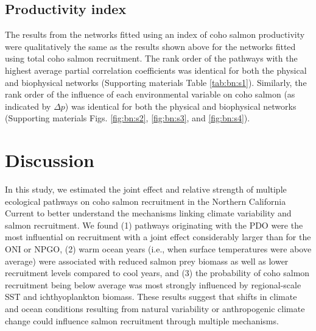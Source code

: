 \subsection{Productivity index}

The results from the networks fitted using an index of coho salmon productivity
were qualitatively the same as the results shown above for the networks fitted
using total coho salmon recruitment. The rank order of the pathways with the
highest average partial correlation coefficients was identical for both the
physical and biophysical networks (Supporting materials Table \ref{tab:bn:s1}). Similarly, the
rank order of the influence of each environmental variable on coho salmon (as
indicated by \(\Delta p\)) was identical for both the physical and biophysical
networks (Supporting materials Figs. \ref{fig:bn:s2}, \ref{fig:bn:s3}, and
\ref{fig:bn:s4}).



\section{Discussion}

In this study, we estimated the joint effect and relative strength of multiple
ecological pathways on coho salmon recruitment in the Northern California
Current to better understand the mechanisms linking climate variability and
salmon recruitment. We found (1) pathways originating with the PDO were the most
influential on recruitment with a joint effect considerably larger than for the
ONI or NPGO, (2) warm ocean years (i.e., when surface temperatures were above
average) were associated with reduced salmon prey biomass as well as lower
recruitment levels compared to cool years, and (3) the probability of coho
salmon recruitment being below average was most strongly influenced by
regional-scale SST and ichthyoplankton biomass. These results suggest that
shifts in climate and ocean conditions resulting from natural variability or
anthropogenic climate change could influence salmon recruitment through multiple
mechanisms.

